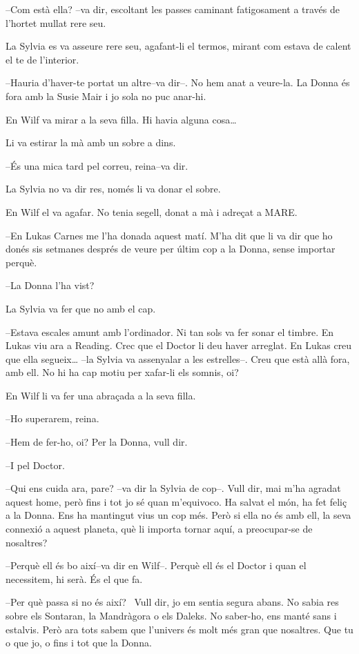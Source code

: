 --Com està ella? --va dir, escoltant les passes caminant fatigosament a
través de l'hortet mullat rere seu.

La Sylvia es va asseure rere seu, agafant-li el termos, mirant com
estava de calent el te de l'interior.

--Hauria d'haver-te portat un altre--va dir--. No hem anat a veure-la.
La Donna és fora amb la Susie Mair i jo sola no puc anar-hi.

En Wilf va mirar a la seva filla. Hi havia alguna cosa\ldots{}

Li va estirar la mà amb un sobre a dins.

--És una mica tard pel correu, reina--va dir.

La Sylvia no va dir res, només li va donar el sobre.

En Wilf el va agafar. No tenia segell, donat a mà i adreçat a MARE.

--En Lukas Carnes me l'ha donada aquest matí. M'ha dit que li va dir que
ho donés sis setmanes després de veure per últim cop a la Donna, sense
importar perquè.

--La Donna l'ha vist?

La Sylvia va fer que no amb el cap.

--Estava escales amunt amb l'ordinador. Ni tan sols va fer sonar el
timbre. En Lukas viu ara a Reading. Crec que el Doctor li deu haver
arreglat. En Lukas creu que ella segueix\ldots{} --la Sylvia va
assenyalar a les estrelles--. Creu que està allà fora, amb ell. No hi ha
cap motiu per xafar-li els somnis, oi?

En Wilf li va fer una abraçada a la seva filla.

--Ho superarem, reina.

--Hem de fer-ho, oi? Per la Donna, vull dir.

--I pel Doctor.

--Qui ens cuida ara, pare? --va dir la Sylvia de cop--. Vull dir, mai
m'ha agradat aquest home, però fins i tot jo sé quan m'equivoco. Ha
salvat el món, ha fet feliç a la Donna. Ens ha mantingut vius un cop
més. Però si ella no és amb ell, la seva connexió a aquest planeta, què
li importa tornar aquí, a preocupar-se de nosaltres?

--Perquè ell és bo així--va dir en Wilf--. Perquè ell és el Doctor i
quan el necessitem, hi serà. És el que fa.

--Per què passa si no és així? ~Vull dir, jo em sentia segura abans. No
sabia res sobre els Sontaran, la Mandràgora o els Daleks. No saber-ho,
ens manté sans i estalvis. Però ara tots sabem que l'univers és molt més
gran que nosaltres. Que tu o que jo, o fins i tot que la Donna.


